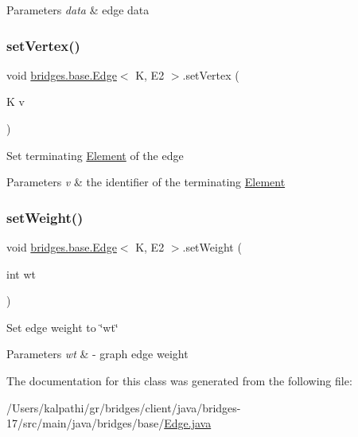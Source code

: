 \begin{DoxyParams}{Parameters}
{\em data} & edge data \\
\hline
\end{DoxyParams}
\mbox{\label{classbridges_1_1base_1_1_edge_a02684f6a156a82d431d5d82cf4f943a2}} 
\subsubsection{\texorpdfstring{set\+Vertex()}{setVertex()}}
{\footnotesize\ttfamily void \mbox{\hyperlink{classbridges_1_1base_1_1_edge}{bridges.\+base.\+Edge}}$<$ K, E2 $>$.set\+Vertex (\begin{DoxyParamCaption}\item[{K}]{v }\end{DoxyParamCaption})}

Set terminating \mbox{\hyperlink{classbridges_1_1base_1_1_element}{Element}} of the edge


\begin{DoxyParams}{Parameters}
{\em v} & the identifier of the terminating \mbox{\hyperlink{classbridges_1_1base_1_1_element}{Element}} \\
\hline
\end{DoxyParams}
\mbox{\label{classbridges_1_1base_1_1_edge_ad60cdae7be19065d528432c0c55f7b8c}} 
\subsubsection{\texorpdfstring{set\+Weight()}{setWeight()}}
{\footnotesize\ttfamily void \mbox{\hyperlink{classbridges_1_1base_1_1_edge}{bridges.\+base.\+Edge}}$<$ K, E2 $>$.set\+Weight (\begin{DoxyParamCaption}\item[{int}]{wt }\end{DoxyParamCaption})}

Set edge weight to \char`\"{}wt\char`\"{}


\begin{DoxyParams}{Parameters}
{\em wt} & -\/ graph edge weight \\
\hline
\end{DoxyParams}


The documentation for this class was generated from the following file\+:\begin{DoxyCompactItemize}
\item 
/\+Users/kalpathi/gr/bridges/client/java/bridges-\/17/src/main/java/bridges/base/\mbox{\hyperlink{_edge_8java}{Edge.\+java}}\end{DoxyCompactItemize}
